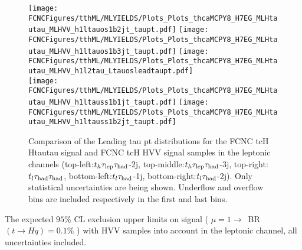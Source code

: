\begin{figure}[htb]
  \centering
  \texttt{[image: \\FCNCFigures/tthML/MLYIELDS/Plots\_Plots\_thcaMCPY8\_H7EG\_MLHtautau\_MLHVV\_h1ltauos1b2jt\_taupt.pdf]}
  \texttt{[image: \\FCNCFigures/tthML/MLYIELDS/Plots\_Plots\_thcaMCPY8\_H7EG\_MLHtautau\_MLHVV\_h1ltauos1b3jt\_taupt.pdf]}
  \texttt{[image: \\FCNCFigures/tthML/MLYIELDS/Plots\_Plots\_thcaMCPY8\_H7EG\_MLHtautau\_MLHVV\_h1l2tau\_Ltauosleadtaupt.pdf]}
  \\
  \texttt{[image: \\FCNCFigures/tthML/MLYIELDS/Plots\_Plots\_thcaMCPY8\_H7EG\_MLHtautau\_MLHVV\_h1ltauss1b1jt\_taupt.pdf]}
  \texttt{[image: \\FCNCFigures/tthML/MLYIELDS/Plots\_Plots\_thcaMCPY8\_H7EG\_MLHtautau\_MLHVV\_h1ltauss1b2jt\_taupt.pdf]}
\\
\caption{ Comparison of the Leading tau pt distributions for the FCNC tcH Htautau signal and FCNC tcH HVV signal samples in the leptonic channels
  (top-left:$t_h\tau_\text{lep}{}\tau_\text{had}$-2j, top-middle:$t_h\tau_\text{lep}{}\tau_\text{had}$-3j, top-right:$t_l\tau_\text{had}{}\tau_\text{had}$, bottom-left:$t_l\tau_\text{had}$-1j, bottom-right:$t_l\tau_\text{had}$-2j). Only statistical uncertainties are being shown. Underflow and overflow bins are included respectively in the first and last bins.}
\label{fig:check_tcH_HWW}
\end{figure}



\begin{table}[htb]
\caption{The expected $95\%$ CL exclusion upper limits on signal ( $\mu=1\to$~BR$(t\to Hq)=0.1\%$ ) with HVV samples into account in the leptonic channel, all uncertainties included.}
\label{tab:ml_limit}

\end{table}



\clearpage

